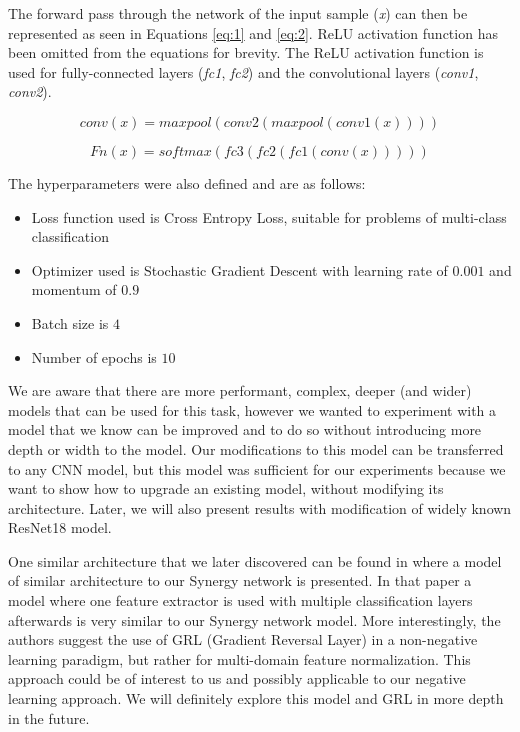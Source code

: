 \documentclass[b5paper]{book}
\let\cite\parencite
\begin{document}
The forward pass through the network of the input sample (\emph{x}) can then be represented as seen in Equations \ref{eq:1} and \ref{eq:2}. ReLU activation function has been omitted from the equations for brevity. The ReLU activation function is used for fully-connected layers (\emph{fc1}, \emph{fc2}) and the convolutional layers (\emph{conv1}, \emph{conv2}).

\begin{equation}\label{eq:1}
conv(x) = maxpool(conv2(maxpool(conv1(x))))
\end{equation}

\begin{equation}\label{eq:2}
Fn(x) = softmax(fc3(fc2(fc1(conv(x)))))
\end{equation}

The hyperparameters were also defined and are as follows:

\begin{itemize}
    \item Loss function used is Cross Entropy Loss, suitable for problems of multi-class classification
    \item Optimizer used is Stochastic Gradient Descent with learning rate of \(0.001\) and momentum of \(0.9\)
    \item Batch size is \(4\)
    \item Number of epochs is \(10\)
\end{itemize}

We are aware that there are more performant, complex, deeper (and wider) models that can be used for this task, however we wanted to experiment with a model that we know can be improved and to do so without introducing more depth or width to the model. Our modifications to this model can be transferred to any CNN model, but this model was sufficient for our experiments because we want to show how to upgrade an existing model, without modifying its architecture. Later, we will also present results with modification of widely known ResNet18 \cite{he2016deep} model.

One similar architecture that we later discovered can be found in \cite{ganin2015unsupervised} where a model of similar architecture to our Synergy network is presented. In that paper a model where one feature extractor is used with multiple classification layers afterwards is very similar to our Synergy network model. More interestingly, the authors suggest the use of GRL (Gradient Reversal Layer) in a non-negative learning paradigm, but rather for multi-domain feature normalization. This approach could be of interest to us and possibly applicable to our negative learning approach. We will definitely explore this model and GRL in more depth in the future.
\end{document}
